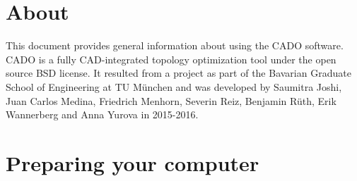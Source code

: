 \documentclass[
12pt, %
a4paper, %
oneside, %
headinclude,footinclude, %
BCOR5mm, %
]{scrartcl}
\begin{document}
\section*{About} %
This document provides general information about using the CADO software. CADO is a fully CAD-integrated topology optimization tool under the open source BSD license. It resulted from a project as part of the Bavarian Graduate School of Engineering at TU München and was developed by Saumitra Joshi, Juan Carlos Medina, Friedrich Menhorn, Severin Reiz, Benjamin R{\"u}th, Erik Wannerberg and Anna Yurova in 2015-2016.


\newpage %


\section{Preparing your computer}
\label{sec:prep}
\end{document}
